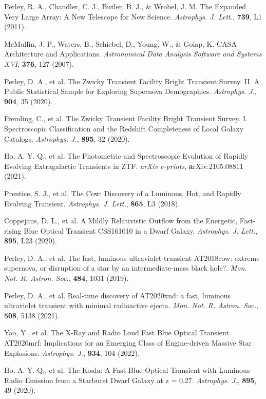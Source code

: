 \documentclass{nature_plusfigure}
\newcommand{\mn}{{Mon. Not. R. Astron. Soc.}}
\newcommand{\mnras}{\mn}
\newcommand{\apj}{{Astrophys. J.}}
\newcommand{\apjl}{{Astrophys. J. Lett.}}
\begin{document}
\begin{methods}
\begin{thebibliography}{10}
 Perley, R. A., Chandler, C. J., Butler, B. J., \& Wrobel, J. M. The Expanded Very Large Array: A New Telescope for New Science. \emph{\apjl}, \textbf{739}, L1 (2011). 

 McMullin, J. P., Waters, B., Schiebel, D., Young, W., \& Golap, K. CASA Architecture and Applications. \emph{Astronomical Data Analysis Software and Systems XVI}, \textbf{376}, 127 (2007). 

 Perley, D. A., et al. The Zwicky Transient Facility Bright Transient Survey. II. A Public Statistical Sample for Exploring Supernova Demographics. \emph{\apj}, \textbf{904}, 35 (2020). 

 Fremling, C., et al. The Zwicky Transient Facility Bright Transient Survey. I. Spectroscopic Classification and the Redshift Completeness of Local Galaxy Catalogs. \emph{\apj}, \textbf{895}, 32 (2020).

 Ho, A. Y. Q., et al. The Photometric and Spectroscopic Evolution of Rapidly Evolving Extragalactic Transients in ZTF. \emph{arXiv e-prints}, \textbf arXiv:2105.08811 (2021). 

 Prentice, S. J., et al. The Cow: Discovery of a Luminous, Hot, and Rapidly Evolving Transient. \emph{\apjl}, \textbf{865}, L3 (2018). 

 Coppejans, D. L., et al. A Mildly Relativistic Outflow from the Energetic, Fast-rising Blue Optical Transient CSS161010 in a Dwarf Galaxy. \emph{\apjl}, \textbf{895}, L23 (2020). 

 Perley, D. A., et al. The fast, luminous ultraviolet transient AT2018cow: extreme supernova, or disruption of a star by an intermediate-mass black hole?. \emph{\mnras}, \textbf{484}, 1031 (2019). 

 Perley, D. A., et al. Real-time discovery of AT2020xnd: a fast, luminous ultraviolet transient with minimal radioactive ejecta. \emph{\mnras}, \textbf{508}, 5138 (2021). 

 Yao, Y., et al. The X-Ray and Radio Loud Fast Blue Optical Transient AT2020mrf: Implications for an Emerging Class of Engine-driven Massive Star Explosions. \emph{\apj}, \textbf{934}, 104 (2022). 

 Ho, A. Y. Q., et al. The Koala: A Fast Blue Optical Transient with Luminous Radio Emission from a Starburst Dwarf Galaxy at z = 0.27. \emph{\apj}, \textbf{895}, 49 (2020). 


\end{thebibliography}
\end{methods}
\end{document}
